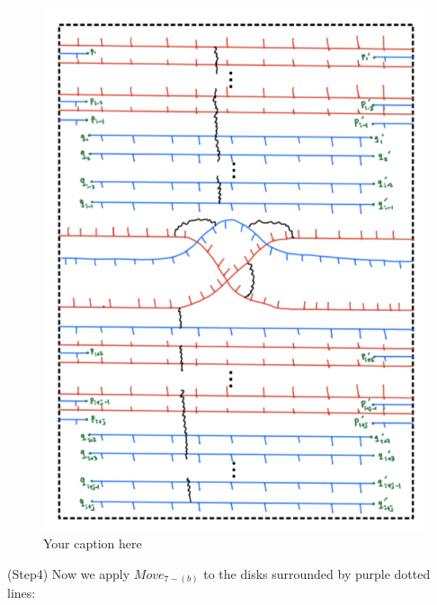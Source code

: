 \begin{figure}[H] %
    \centering
    \includegraphics[width=\linewidth]{diagrams/theorem12/8.png} %
    \caption{Your caption here}
    \label{fig:your-label}
\end{figure}

(Step4) Now we apply $Move_{7-(b)}$ to the disks surrounded by purple dotted lines:

